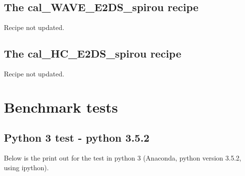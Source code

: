 \subsection{The cal\_WAVE\_E2DS\_spirou recipe}
\label{ch:changelog:At4:cal_WAVE_E2DS_spirou}

Recipe not updated.

\subsection{The cal\_HC\_E2DS\_spirou recipe}
\label{ch:changelog:At4:cal_HC_E2DS_spirou}

Recipe not updated.



\section{Benchmark tests}
\label{ch:changelog:At4:benchmark tests}

\subsection{Python 3 test - python 3.5.2}

Below is the print out for the test in python 3 (Anaconda, python version 3.5.2, using ipython).


